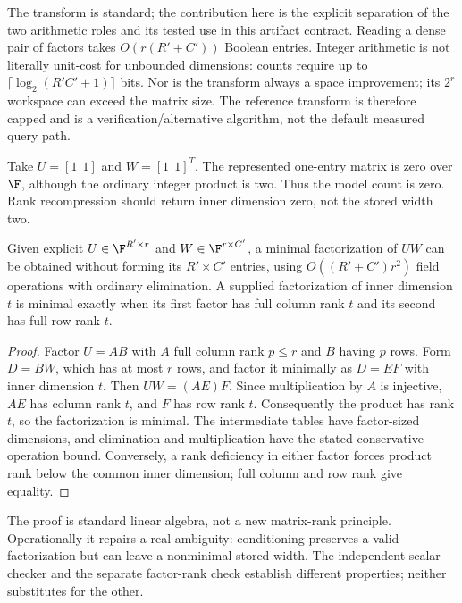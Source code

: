 The transform is standard\cite{alman2023}; the contribution here is the explicit separation of the two arithmetic roles and its tested use in this artifact contract. Reading a dense pair of factors takes $O(r(R'+C'))$ Boolean entries. Integer arithmetic is not literally unit-cost for unbounded dimensions: counts require up to $\lceil\log_2(R'C'+1)\rceil$ bits. Nor is the transform always a space improvement; its $2^r$ workspace can exceed the matrix size. The reference transform is therefore capped and is a verification/alternative algorithm, not the default measured query path.

\begin{example}
Take $U=[1\ \ 1]$ and $W=[1\ \ 1]^T$. The represented one-entry matrix is zero over $\F$, although the ordinary integer product is two. Thus the model count is zero. Rank recompression should return inner dimension zero, not the stored width two.
\end{example}

\begin{proposition}
\label{prop:recompress}
Given explicit $U\in\F^{R'\times r}$ and $W\in\F^{r\times C'}$, a minimal factorization of $UW$ can be obtained without forming its $R'\times C'$ entries, using $O((R'+C')r^2)$ field operations with ordinary elimination. A supplied factorization of inner dimension $t$ is minimal exactly when its first factor has full column rank $t$ and its second has full row rank $t$.
\end{proposition}
\begin{proof}
Factor $U=AB$ with $A$ full column rank $p\le r$ and $B$ having $p$ rows. Form $D=BW$, which has at most $r$ rows, and factor it minimally as $D=EF$ with inner dimension $t$. Then $UW=(AE)F$. Since multiplication by $A$ is injective, $AE$ has column rank $t$, and $F$ has row rank $t$. Consequently the product has rank $t$, so the factorization is minimal. The intermediate tables have factor-sized dimensions, and elimination and multiplication have the stated conservative operation bound. Conversely, a rank deficiency in either factor forces product rank below the common inner dimension; full column and row rank give equality.
\end{proof}

The proof is standard linear algebra, not a new matrix-rank principle. Operationally it repairs a real ambiguity: conditioning preserves a valid factorization but can leave a nonminimal stored width. The independent scalar checker and the separate factor-rank check establish different properties; neither substitutes for the other.


